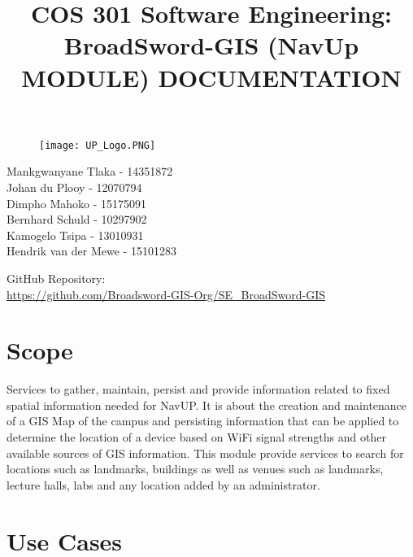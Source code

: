 \documentclass{article}
\begin{document}
		\begin{figure}[t]
			\centering
			\texttt{[image: UP\_Logo.PNG]}
		\end{figure}
	
			\title{COS 301 Software Engineering: BroadSword-GIS (NavUp MODULE) DOCUMENTATION}
\maketitle
				
		\begin{flushright} \large
			Mankgwanyane Tlaka    - 14351872\\
			Johan	     du Plooy -	12070794\\
			Dimpho	     Mahoko   -	15175091\\
			Bernhard	 Schuld	  - 10297902\\
			Kamogelo	 Tsipa	  - 13010931\\
			Hendrik	van  der Mewe - 15101283\\
		\end{flushright}
		
		
		
		
		GitHub Repository: \href{https://github.com/Broadsword-GIS-Org/SE_BroadSword-GIS}\\
		\url{https://github.com/Broadsword-GIS-Org/SE_BroadSword-GIS}
	

\clearpage
\tableofcontents
\clearpage

\section{Scope}
Services to gather, maintain, persist and provide information related to fixed
spatial information needed for NavUP. It is about the creation and maintenance
 of a GIS Map of the campus and persisting information that can be
applied to determine the location of a device based on WiFi signal strengths
and other available sources of GIS information.
This module provide services to search for locations such as landmarks,
buildings as well as venues such as landmarks, lecture halls, labs and any location added by an administrator.

\section{Use Cases}
\end{document}
